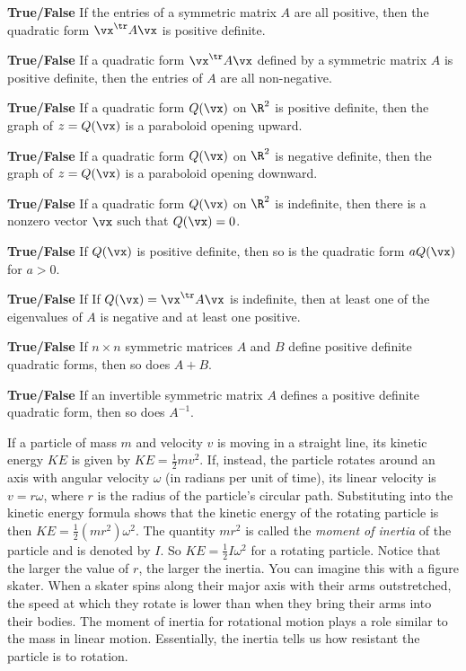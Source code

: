 	\item \textbf{True/False} If the entries of a symmetric matrix $A$ are all positive, then the quadratic form $\vx^{\tr}A\vx$ is positive definite. 


	\item \textbf{True/False} If a quadratic form $\vx^{\tr}A \vx$ defined by a symmetric matrix $A$ is positive definite, then the entries of $A$ are all non-negative. 


\item \textbf{True/False} If a quadratic form $Q(\vx)$ on $\R^2$ is positive definite, then the graph of $z=Q(\vx)$ is a paraboloid opening upward.

\item \textbf{True/False} If a quadratic form $Q(\vx)$ on $\R^2$ is negative definite, then the graph of $z=Q(\vx)$ is a paraboloid opening downward.

\item \textbf{True/False} If a quadratic form $Q(\vx)$ on $\R^2$ is indefinite, then there is a nonzero vector $\vx$ such that $Q(\vx) = 0$. 

\item \textbf{True/False} If $Q(\vx)$ is positive definite, then so is the quadratic form $aQ(\vx)$ for $a>0$.

\item \textbf{True/False} If If $Q(\vx)=\vx^\tr A\vx$ is indefinite, then at least one of the eigenvalues of $A$ is negative and at least one positive.

\item \textbf{True/False} If $n \times n$ symmetric matrices $A$ and $B$ define positive definite quadratic forms, then so does $A+B$.

\item \textbf{True/False} If an invertible symmetric matrix $A$ defines a positive definite quadratic form, then so does $A^{-1}$.


	 \ea
	 
\ee

\label{sec:proj_tennis}

If a particle of mass $m$ and velocity $v$ is moving in a straight line, its kinetic energy $KE$ is given by $KE = \frac{1}{2}mv^2$. If, instead, the particle rotates around an axis with angular velocity $\omega$ (in radians per unit of time), its linear velocity is $v = r \omega$, where $r$ is the radius of the particle's circular path. Substituting into the kinetic energy formula shows that the kinetic energy of the rotating particle is then $KE = \frac{1}{2}\left(mr^2\right) \omega^2$. The quantity $mr^2$ is called the \emph{moment of inertia} of the particle and is denoted by $I$. So $KE = \frac{1}{2}I\omega^2$ for a rotating particle. Notice that the larger the value of $r$, the larger the inertia. You can imagine this with a figure skater. When a skater spins along their major axis with their arms outstretched, the speed at which they rotate is lower than when they bring their arms into their bodies. The moment of inertia for rotational motion plays a role similar to the mass in linear motion. Essentially, the inertia tells us how resistant the particle is to rotation. 

